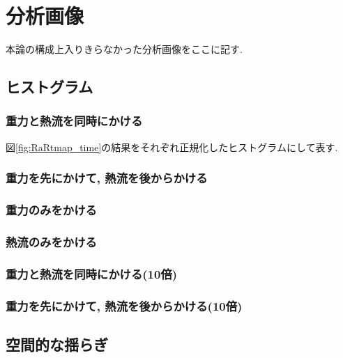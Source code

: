 \chapter{分析画像}\label{ap:analysis}

本論の構成上入りきらなかった分析画像をここに記す.

\section{ヒストグラム}

\subsection{重力と熱流を同時にかける}

図\ref{fig:RaRtmap_time}の結果をそれぞれ正規化したヒストグラムにして表す.



\subsection{重力を先にかけて, 熱流を後からかける}



\subsection{重力のみをかける}



\subsection{熱流のみをかける}



\subsection{重力と熱流を同時にかける(10倍)}



\subsection{重力を先にかけて, 熱流を後からかける(10倍)}




\section{空間的な揺らぎ}

